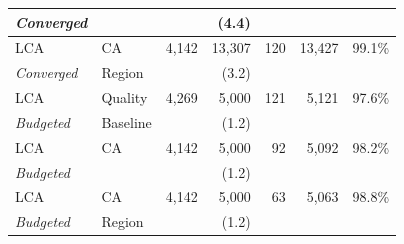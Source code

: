 \begin{table}[!t]
\begin{center}
\begin{tabular}{| l | l | r | r | r | r | r |}
            \textit{Converged}    &              &                      & (4.4)            &                  &                  &                     \\
            \hline
            LCA                   & CA           & 4,142                & 13,307           & 120              & 13,427           & 99.1\%              \\
            \textit{Converged}    & Region       &                      & (3.2)            &                  &                  &                     \\
            \hline
            \hline
            LCA                   & Quality      & 4,269                & 5,000            & 121              & 5,121            & 97.6\%              \\
            \textit{Budgeted}     & Baseline     &                      & (1.2)            &                  &                  &                     \\
            \hline
            LCA                   & CA           & 4,142                & 5,000            & 92               & 5,092            & 98.2\%              \\
            \textit{Budgeted}     &              &                      & (1.2)            &                  &                  &                     \\
            \hline
            LCA                   & CA           & 4,142                & 5,000            & 63               & 5,063            & 98.8\%              \\
            \textit{Budgeted}     & Region       &                      & (1.2)            &                  &                  &                     \\
            \hline
        \end{tabular}
    \end{center}
\end{table}


